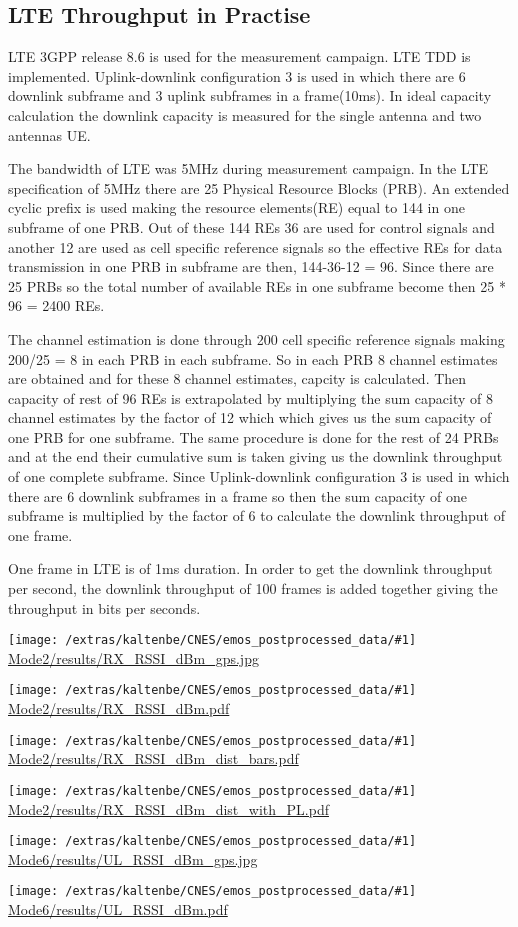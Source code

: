 \documentclass[a4paper,10pt]{article}
\newcommand{\printfile}[1]{
 \begin{minipage}{8cm}
  \centering
  \texttt{[image: /extras/kaltenbe/CNES/emos\_postprocessed\_data/\#1]}
  \url{#1}

 \end{minipage}
}
\begin{document}
\subsection{LTE Throughput in Practise}

LTE 3GPP release 8.6 is used for the measurement campaign. LTE TDD is implemented. Uplink-downlink configuration 3 is used in which there are 6 downlink subframe and 3 uplink subframes in a frame(10ms). In ideal capacity calculation the downlink capacity is measured for the single antenna and two antennas UE.  

The bandwidth of LTE was 5MHz during measurement campaign. In the LTE specification of 5MHz there are 25 Physical Resource Blocks (PRB). An extended cyclic prefix is used making the resource elements(RE) equal to 144 in one subframe of one PRB. Out of these 144 REs 36 are used for control signals and another 12 are used as cell specific reference signals so the effective REs for data transmission in one PRB in subframe are then, 144-36-12 = 96. Since there are 25 PRBs so the total number of available REs in one subframe become then 25 * 96 = 2400 REs. 

The channel estimation is done through 200 cell specific reference signals making 200/25 = 8 in each PRB in each subframe. So in each PRB 8 channel estimates are obtained and for these 8 channel estimates, capcity is calculated. Then capacity of rest of 96 REs is extrapolated by multiplying the sum capacity of 8 channel estimates by the factor of 12 which which gives us the sum capacity of one PRB for one subframe. The same procedure is done for the rest of 24 PRBs and at the end their cumulative sum is taken giving us the downlink throughput of one complete subframe. Since Uplink-downlink configuration 3 is used in which there are 6 downlink subframes in a frame so then the sum capacity of one subframe is multiplied by the factor of 6 to calculate the downlink throughput of one frame. 

One frame in LTE is of 1ms duration. In order to get the downlink throughput per second, the downlink throughput of 100 frames is added together giving the throughput in bits per seconds.


\printfile{Mode2/results/RX_RSSI_dBm_gps.jpg}
\printfile{Mode2/results/RX_RSSI_dBm.pdf}

\printfile{Mode2/results/RX_RSSI_dBm_dist_bars.pdf}
\printfile{Mode2/results/RX_RSSI_dBm_dist_with_PL.pdf}

\printfile{Mode6/results/UL_RSSI_dBm_gps.jpg}
\printfile{Mode6/results/UL_RSSI_dBm.pdf}
\end{document}
